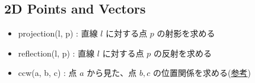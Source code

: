 \subsection{2D Points and Vectors}

\begin{itemize}
	\item projection(l, p) : 直線 $l$ に対する点 $p$ の射影を求める
	\item reflection(l, p) : 直線 $l$ に対する点 $p$ の反射を求める
	\item ccw(a, b, c) : 点 $a$ から見た、点 $b, c$ の位置関係を求める(\href{https://onlinejudge.u-aizu.ac.jp/courses/library/4/CGL/all/CGL_1_C}{参考})
\end{itemize}


